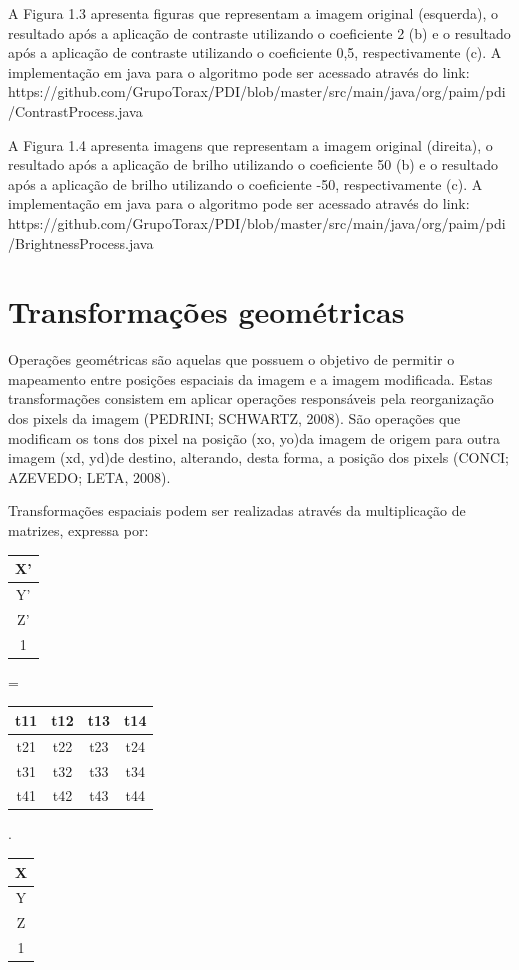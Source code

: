 \documentclass[
	12pt,				%
	oneside,			%
	a4paper,			%
	english,			%
	french,				%
	spanish,			%
	brazil,				%
	]{abntex2}
\begin{document}
A Figura 1.3 apresenta figuras que representam a imagem original (esquerda), o resultado após a aplicação de contraste utilizando o coeficiente 2 (b) e o resultado após a aplicação de contraste utilizando o coeficiente 0,5, respectivamente (c). A implementação em java para o algoritmo pode ser acessado através do link:
https://github.com/GrupoTorax/PDI/blob/master/src/main/java/org/paim/pdi/ContrastProcess.java 

A Figura 1.4 apresenta imagens que representam a imagem original (direita), o resultado após a aplicação de brilho utilizando o coeficiente 50 (b) e o resultado após a aplicação de brilho utilizando o coeficiente -50, respectivamente (c). A implementação em java para o algoritmo pode ser acessado através do link:
https://github.com/GrupoTorax/PDI/blob/master/src/main/java/org/paim/pdi/BrightnessProcess.java

\section{Transformações geométricas}

Operações geométricas são aquelas que possuem o objetivo de permitir o mapeamento entre posições espaciais da imagem e a imagem modificada. Estas transformações consistem em aplicar operações responsáveis pela reorganização dos pixels da imagem (PEDRINI; SCHWARTZ, 2008). São operações que modificam os tons dos pixel na posição (xo, yo)da imagem de origem para outra imagem (xd, yd)de destino, alterando, desta forma, a posição dos pixels (CONCI; AZEVEDO; LETA, 2008).

Transformações espaciais podem ser realizadas através da multiplicação de matrizes, expressa por:

\begin{tabular}{|c|}
    \hline
	X’       \\ \hline
	Y’       \\ \hline
	Z’       \\ \hline
    1        \\ \hline
\end{tabular}
=
\begin{tabular}{|c|c|c|c|}
	\hline
    t11 & t12 & t13 & t14   \\ \hline
	t21 & t22 & t23 & t24   \\ \hline   
	t31 & t32 & t33 & t34   \\ \hline   
	t41 & t42 & t43 & t44   \\ \hline   
\end{tabular}
.
\begin{tabular}{|c|}
    \hline
	X       \\ \hline
	Y       \\ \hline
	Z       \\ \hline
    1        \\ \hline
\end{tabular}
\end{document}
